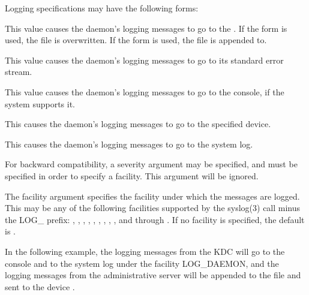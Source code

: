 \documentclass[letterpaper,10pt,english]{sphinxmanual}
\begin{document}
\sphinxAtStartPar
Logging specifications may have the following forms:
\begin{description}
\sphinxAtStartPar
This value causes the daemon’s logging messages to go to the
.  If the \sphinxcode{\sphinxupquote{=}} form is used, the file is overwritten.
If the \sphinxcode{\sphinxupquote{:}} form is used, the file is appended to.

\sphinxAtStartPar
This value causes the daemon’s logging messages to go to its
standard error stream.

\sphinxAtStartPar
This value causes the daemon’s logging messages to go to the
console, if the system supports it.

\sphinxAtStartPar
This causes the daemon’s logging messages to go to the specified
device.

\sphinxAtStartPar
This causes the daemon’s logging messages to go to the system log.

\sphinxAtStartPar
For backward compatibility, a severity argument may be specified,
and must be specified in order to specify a facility.  This
argument will be ignored.

\sphinxAtStartPar
The facility argument specifies the facility under which the
messages are logged.  This may be any of the following facilities
supported by the syslog(3) call minus the LOG\_ prefix: ,
, , , , , ,
, , and  through .  If no
facility is specified, the default is .

\end{description}

\sphinxAtStartPar
In the following example, the logging messages from the KDC will go to
the console and to the system log under the facility LOG\_DAEMON, and
the logging messages from the administrative server will be appended
to the file  and sent to the device
.
\end{document}
